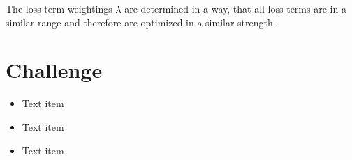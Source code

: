 \documentclass[landscape,a2,final,12pt]{issposter}
\begin{document}
\begin{multicols}{3}
\begin{small}
        The loss term weightings $\lambda$ are determined in a way, that all loss terms are in a 
        similar range and therefore are optimized in a similar strength.

        \end{small}
    \columnbreak
    \section{Challenge}
        \begin{itemize}
            \item Text item
            \item Text item
            \item Text item
        \end{itemize}
    \columnbreak
\end{multicols}
\end{document}

